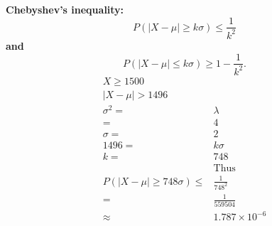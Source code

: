 \documentclass{article}
\begin{document}
            \subsubsection{}
                \paragraph{
                    Chebyshev's inequality:
                    $$
                    P(|X-\mu|\geq k\sigma)\leq \frac{1}{k^2}
                    $$
                    and
                    $$
                    P(|X-\mu|\leq k\sigma)\geq 1-\frac{1}{k^2}.
                    $$
                    \begin{equation}
                        \begin{split}
                            X\geq 1500\\
                            |X-\mu|>1496\\
                            \sigma^2=&\lambda\\
                                =&4\\
                            \sigma=&2\\
                            1496=&k\sigma\\
                            k=&748\\
                            &\text{Thus}\\
                            P(|X-\mu|\geq 748\sigma)\leq& \frac{1}{748^2}\\
                                =&\frac{1}{559504}\\
                                \approx&1.787\times 10^{-6}\\
                        \end{split}
                    \end{equation}
                }
\end{document}
